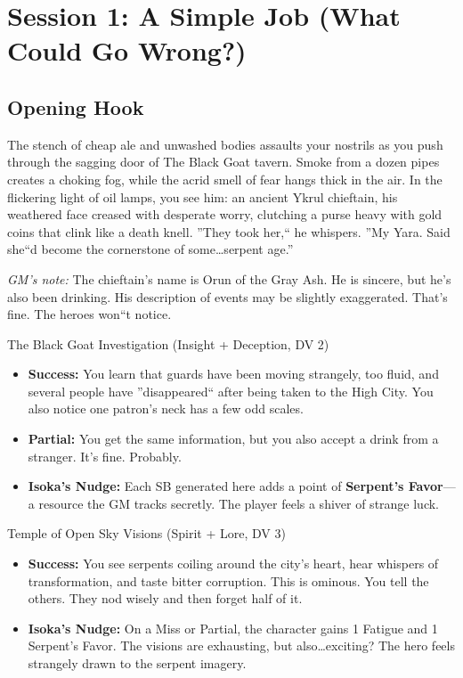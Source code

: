 \documentclass[11pt]{article}
\begin{document}
\section*{Session 1: A Simple Job (What Could Go Wrong?)}

\subsection*{Opening Hook}
The stench of cheap ale and unwashed bodies assaults your nostrils as you push through the sagging door of The Black Goat tavern. Smoke from a dozen pipes creates a choking fog, while the acrid smell of fear hangs thick in the air. In the flickering light of oil lamps, you see him: an ancient Ykrul chieftain, his weathered face creased with desperate worry, clutching a purse heavy with gold coins that clink like a death knell. ''They took her,`` he whispers. ''My Yara. Said she``d become the cornerstone of some\dots serpent age.''

\textit{GM's note:} The chieftain's name is Orun of the Gray Ash. He is sincere, but he's also been drinking. His description of events may be slightly exaggerated. That's fine. The heroes won``t notice.

\begin{mechanicsbox}{The Black Goat Investigation (Insight + Deception, DV 2)}
\begin{itemize}
    \item \textbf{Success:} You learn that guards have been moving strangely, too fluid, and several people have ''disappeared`` after being taken to the High City. You also notice one patron's neck has a few odd scales.
    \item \textbf{Partial:} You get the same information, but you also accept a drink from a stranger. It's fine. Probably.
    \item \textbf{Isoka's Nudge:} Each SB generated here adds a point of \textbf{Serpent's Favor}---a resource the GM tracks secretly. The player feels a shiver of strange luck.
\end{itemize}
\end{mechanicsbox}

\begin{mechanicsbox}{Temple of Open Sky Visions (Spirit + Lore, DV 3)}
\begin{itemize}
    \item \textbf{Success:} You see serpents coiling around the city's heart, hear whispers of transformation, and taste bitter corruption. This is ominous. You tell the others. They nod wisely and then forget half of it.
    \item \textbf{Isoka's Nudge:} On a Miss or Partial, the character gains 1 Fatigue and 1 Serpent's Favor. The visions are exhausting, but also\dots exciting? The hero feels strangely drawn to the serpent imagery.
\end{itemize}
\end{mechanicsbox}
\end{document}
